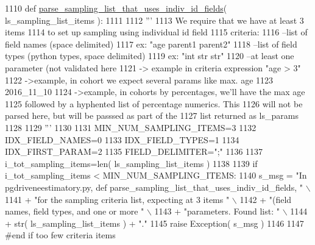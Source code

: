 \begin{DoxyCode}
1110 \textcolor{keyword}{def }\hyperlink{namespacenegui_1_1pgdriveneestimator_a367b16a89c7ae46ab0bda5b37e68d9af}{parse\_sampling\_list\_that\_uses\_indiv\_id\_fields}( 
      ls\_sampling\_list\_items ):
1111 
1112     \textcolor{stringliteral}{'''}
1113 \textcolor{stringliteral}{    We require that we have at least 3 items}
1114 \textcolor{stringliteral}{    to set up  sampling using individual id field}
1115 \textcolor{stringliteral}{    criteria:}
1116 \textcolor{stringliteral}{    --list of field names (space delimited)}
1117 \textcolor{stringliteral}{        ex: "age parent1 parent2"}
1118 \textcolor{stringliteral}{    --list of field types (python types, space delimited)}
1119 \textcolor{stringliteral}{        ex: "int str str"}
1120 \textcolor{stringliteral}{    --at least one parameter (not validated here}
1121 \textcolor{stringliteral}{        -> example in criteria expression  "age > 3"}
1122 \textcolor{stringliteral}{        ->example, in cohort we expect several params like max. age     }
1123 \textcolor{stringliteral}{    2016\_11\_10}
1124 \textcolor{stringliteral}{        ->example, in cohorts by percentages, we'll have the max age}
1125 \textcolor{stringliteral}{          followed by a hyphented list of percentage numerics.  This}
1126 \textcolor{stringliteral}{          will not be parsed here, but will be passsed as part of the}
1127 \textcolor{stringliteral}{          list returned as  ls\_params}
1128 \textcolor{stringliteral}{}
1129 \textcolor{stringliteral}{    '''}
1130 
1131     MIN\_NUM\_SAMPLING\_ITEMS=3
1132     IDX\_FIELD\_NAMES=0
1133     IDX\_FIELD\_TYPES=1
1134     IDX\_FIRST\_PARAM=2
1135     FIELD\_DELIMITER=\textcolor{stringliteral}{";"}
1136 
1137     i\_tot\_sampling\_items=len( ls\_sampling\_list\_items )
1138 
1139     \textcolor{keywordflow}{if} i\_tot\_sampling\_items < MIN\_NUM\_SAMPLING\_ITEMS:
1140         s\_msg = \textcolor{stringliteral}{"In pgdriveneestimatory.py, def parse\_sampling\_list\_that\_uses\_indiv\_id\_fields, "} \(\backslash\)
1141                     + \textcolor{stringliteral}{"for the sampling criteria list, expecting at 3 items "} \(\backslash\)
1142                     + \textcolor{stringliteral}{"(field names, field types, and one or more "} \(\backslash\)
1143                     + \textcolor{stringliteral}{"parameters.  Found list: "} \(\backslash\)
1144                     + str( ls\_sampling\_list\_items ) + \textcolor{stringliteral}{"."}
1145         \textcolor{keywordflow}{raise} Exception( s\_msg )
1146 
1147     \textcolor{comment}{#end if too few criteria items}

\end{DoxyCode}
